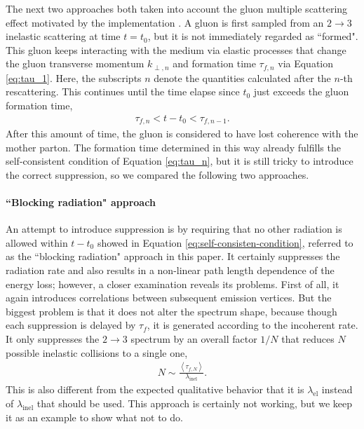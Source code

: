 \documentclass[aps, prc, reprint, amsmath, groupedaddress, nofootinbib]{revtex4-1}
\begin{document}
The next two approaches both taken into account the gluon multiple scattering effect motivated by the implementation \cite{Zapp:2011ya}.
A gluon is first sampled from an $2\rightarrow3$ inelastic scattering at time $t=t_0$, but it is not immediately regarded as ``formed". 
This gluon keeps interacting with the medium via elastic processes that change the gluon transverse momentum $k_{\perp,n}$ and formation time $\tau_{f,n}$ via Equation \ref{eq:tau_1}.
Here, the subscripts $n$ denote the quantities calculated after the $n$-th rescattering.
This continues until the time elapse since $t_0$ just exceeds the gluon formation time,
\begin{eqnarray}\label{eq:self-consisten-condition}
\tau_{f, n} < t-t_0 < \tau_{f, n-1}.
\end{eqnarray}
After this amount of time, the gluon is considered to have lost coherence with the mother parton.
The formation time determined in this way already fulfills the self-consistent condition of Equation \ref{eq:tau_n}, but it is still tricky to introduce the correct suppression, so we compared the following two approaches. 

\paragraph*{``Blocking radiation" approach}
An attempt to introduce suppression is by requiring that no other radiation is allowed within $t-t_0$ showed in Equation \ref{eq:self-consisten-condition}, referred to as the ``blocking radiation" approach in this paper.
It certainly suppresses the radiation rate and also results in a non-linear path length dependence of the energy loss; however, a closer examination reveals its problems.
First of all, it again introduces correlations between subsequent emission vertices.
But the biggest problem is that it does not alter the spectrum shape, because though each suppression is delayed by $\tau_f$, it is generated according to the incoherent rate. 
It only suppresses the $2\rightarrow 3$ spectrum by an overall factor $1/N$ that reduces $N$ possible inelastic collisions to a single one,
\begin{eqnarray}
N \sim \frac{\left\langle\tau_{f,N}\right\rangle}{ \lambda_{\textrm{inel}}}.
\end{eqnarray}
This is also different from the expected qualitative behavior that it is  $\lambda_{\textrm{el}}$ instead of $\lambda_{\textrm{inel}}$ that should be used.
This approach is certainly not working, but we keep it as an example to show what not to do.
\end{document}
